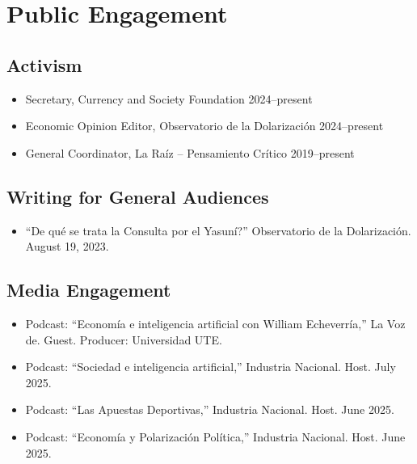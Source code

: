 ﻿\documentclass[11pt]{article}
\begin{document}
\section*{Public Engagement}
\subsection*{Activism}
\begin{itemize}
\item Secretary, Currency and Society Foundation \hfill 2024--present
\item Economic Opinion Editor, Observatorio de la Dolarizaci\'on \hfill 2024--present
\item General Coordinator, La Ra\'iz -- Pensamiento Cr\'itico \hfill 2019--present
\end{itemize}

\subsection*{Writing for General Audiences}
\begin{itemize}
\item ``\textquestiondown De qu\'e se trata la Consulta por el Yasun\'i?'' Observatorio de la Dolarizaci\'on. August 19, 2023.
\end{itemize}

\subsection*{Media Engagement}
\begin{itemize}
\item Podcast: ``Econom\'ia e inteligencia artificial con William Echeverr\'ia,'' La Voz de. Guest. Producer: Universidad UTE.
\item Podcast: ``Sociedad e inteligencia artificial,'' Industria Nacional. Host. July 2025.
\item Podcast: ``Las Apuestas Deportivas,'' Industria Nacional. Host. June 2025.
\item Podcast: ``Econom\'ia y Polarizaci\'on Pol\'itica,'' Industria Nacional. Host. June 2025.
\end{itemize}
\end{document}
